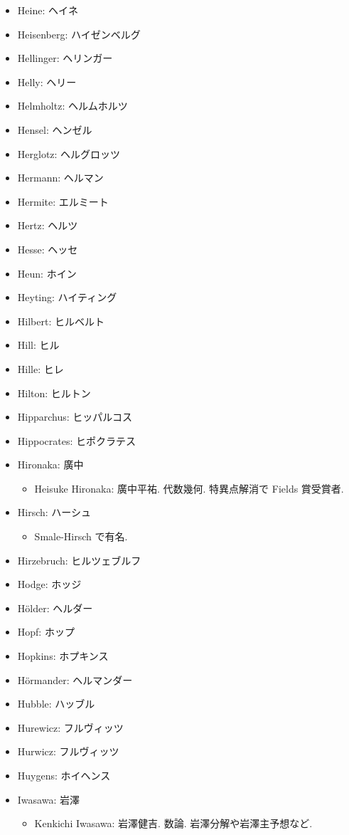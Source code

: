 \documentclass[openany, a4paper, oneside]{jsbook}
\begin{document}
\begin{itemize}
\item Heine: ヘイネ
\item Heisenberg: ハイゼンベルグ
\item Hellinger: ヘリンガー
\item Helly: ヘリー
\item Helmholtz: ヘルムホルツ
\item Hensel: ヘンゼル
\item Herglotz: ヘルグロッツ
\item Hermann: ヘルマン
\item Hermite: エルミート
\item Hertz: ヘルツ
\item Hesse: ヘッセ
\item Heun: ホイン
\item Heyting: ハイティング
\item Hilbert: ヒルベルト
\item Hill: ヒル
\item Hille: ヒレ
\item Hilton: ヒルトン
\item Hipparchus: ヒッパルコス
\item Hippocrates: ヒポクラテス
\item Hironaka: 廣中
\begin{itemize}
\item Heisuke Hironaka: 廣中平祐. 代数幾何. 特異点解消で Fields 賞受賞者.
\end{itemize}
\item Hirsch: ハーシュ
\begin{itemize}
\item Smale-Hirsch で有名.
\end{itemize}
\item Hirzebruch: ヒルツェブルフ
\item Hodge: ホッジ
\item H\"older: ヘルダー
\item Hopf: ホップ
\item Hopkins: ホプキンス
\item H\"ormander: ヘルマンダー
\item Hubble: ハッブル
\item Hurewicz: フルヴィッツ
\item Hurwicz: フルヴィッツ
\item Huygens: ホイヘンス
\item Iwasawa: 岩澤
\begin{itemize}
\item Kenkichi Iwasawa: 岩澤健吉. 数論. 岩澤分解や岩澤主予想など.

\end{itemize}
\end{itemize}
\end{document}
